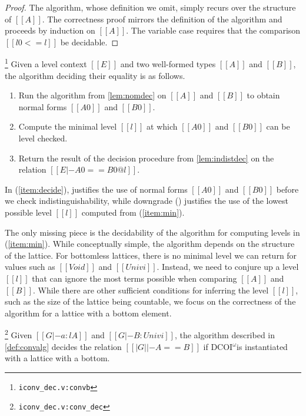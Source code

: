 \documentclass[acmsmall, screen=true, nonacm=true,
  review=\ifpublic false\else true\fi,
  anonymous=\ifanonymous true\else false\fi
]{acmart}
\makeatletter
\newcommand{\name}{\texorpdfstring{DCOI$^{\omega}$\@\xspace}{DCOI-omega}}
\newcommand{\suppl}[3]{{\scriptsize\texttt{#2:#3}}}
\newlength{\punctwidth}
\newcommand{\stack}[1]{%
  \settowidth{\punctwidth}{#1}%
  \hspace*{-\the\punctwidth}%
}
\makeatother
\begin{document}
\begin{proof}
  The algorithm, whose definition we omit, simply recurs over the
  structure of $[[A]]$.
  The correctness proof mirrors the definition of the algorithm and
  proceeds by induction on $[[A]]$. The variable case requires that the
  comparison $[[l0 <= l]]$ be decidable.
\end{proof}

\begin{definition}
  \stack{.~}\footnote{\suppl{theories}{iconv\_dec.v}{convb}}
  \label{def:convalg}
  Given a level context $[[E]]$ and two well-formed types $[[A]]$
  and $[[B]]$, the algorithm deciding their equality is as follows.
  \begin{enumerate}
  \item \label{item:nf}
    Run the algorithm from \cref{lem:nomdec} on $[[A]]$ and
    $[[B]]$ to obtain normal forms $[[A0]]$ and $[[B0]]$.
  \item \label{item:min}
    Compute the minimal level $[[l]]$
    at which $[[A0]]$ and $[[B0]]$ can be level checked.
  \item \label{item:decide}
    Return the result of the decision procedure from
    \cref{lem:indistdec} on the relation
    $[[E |- A0 == B0 @ l]]$.
  \end{enumerate}
\end{definition}

In (\ref{item:decide}),  justifies the use of
normal forms $[[A0]]$ and $[[B0]]$
before we check indistinguishability, while downgrade
() justifies the
use of the lowest possible level $[[l]]$ computed from (\ref{item:min}).


The only missing piece is the decidability of the algorithm for
computing levels in (\ref{item:min}).
While conceptually simple, the algorithm depends
on the structure of the lattice. For bottomless
lattices, there is no minimal level we can return for values such as
$[[Void]]$ and $[[Univ i]]$. Instead, we need to conjure up a level
$[[l]]$ that can ignore the most terms possible when comparing
$[[A]]$ and $[[B]]$. While there are other sufficient conditions for
inferring the level $[[l]]$, such as the size of the lattice being
countable, we focus on the correctness of the algorithm for a lattice
with a bottom element.
\begin{theorem}
  \stack{.~}\footnote{\suppl{theories}{iconv\_dec.v}{conv\_dec}}
  \label{lem:decconv}
  Given $[[G |- a : l A]]$ and $[[G |- B : Univ i]]$, the algorithm
  described in \cref{def:convalg} decides the relation $[[|G| |- A ==
  B]]$ if \name is instantiated with a lattice with a bottom.
\end{theorem}
\end{document}
